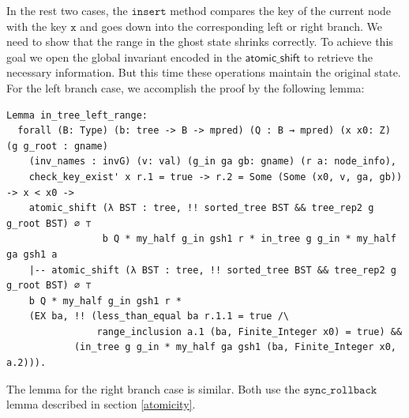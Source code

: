 \documentclass[acmsmall,screen]{acmart}\settopmatter{printfolios=true}
\begin{document}
In the rest two cases, the $\texttt{insert}$ method compares the key
of the current node with the key $\texttt{x}$ and goes down into the
corresponding left or right branch. We need to show that the range in
the ghost state shrinks correctly. To achieve this goal we open the
global invariant encoded in the $\mathsf{atomic\_shift}$ to retrieve
the necessary information. But this time these operations maintain the
original state. For the left branch case, we accomplish the proof by
the following lemma:
\begin{verbatim}
Lemma in_tree_left_range:
  forall (B: Type) (b: tree -> B -> mpred) (Q : B → mpred) (x x0: Z) (g g_root : gname)
    (inv_names : invG) (v: val) (g_in ga gb: gname) (r a: node_info),
    check_key_exist' x r.1 = true -> r.2 = Some (Some (x0, v, ga, gb)) -> x < x0 ->
    atomic_shift (λ BST : tree, !! sorted_tree BST && tree_rep2 g g_root BST) ∅ ⊤
                 b Q * my_half g_in gsh1 r * in_tree g g_in * my_half ga gsh1 a
    |-- atomic_shift (λ BST : tree, !! sorted_tree BST && tree_rep2 g g_root BST) ∅ ⊤
    b Q * my_half g_in gsh1 r *
    (EX ba, !! (less_than_equal ba r.1.1 = true /\
                range_inclusion a.1 (ba, Finite_Integer x0) = true) &&
            (in_tree g g_in * my_half ga gsh1 (ba, Finite_Integer x0, a.2))).  
\end{verbatim}
The lemma for the right branch case is similar. Both use the
$\texttt{sync\_rollback}$ lemma described in section \ref{atomicity}.
  
\end{document}
